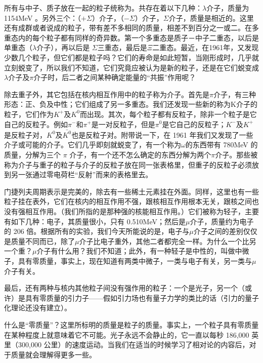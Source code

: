 所有与中子、质子放在一起的粒子统称为。共存在着以下几种：$\lambda$介子，质量为 1154MeV 。另外三个：（$ +\Sigma $）介子，（$ -\Sigma $）介子，$ \Sigma $介子，质量是相近的。这里还有成群或者说成的粒子，带有差不多相同的质量，相差不到百分之一或二。在多重态内的每个粒子都有同样的奇异数。第一个多重态是质子－中子二重态，以后是单重态（$\lambda$介子），再以后是 $ \Sigma $三重态，最后是$ \Xi $二重态。最近，在1961年，又发现少数几个粒子，但它们都是粒子吗？它们的寿命是如此短暂，当刚形成时，几乎就立刻蜕变了，所以我们不知道，它们究竟应被认为是新的粒子，还是在它们蜕变成$\lambda$介子及$\pi$介子时，后二者之间某种确定能量的“共振”作用呢？

除去重子外，其它包括在核内相互作用中的粒子称为介子。首先是$\pi$介子，有三种形态：正、负及中性；它们组成了另一多重态。我们还发现一些新的称为K介子的粒子，它们作为$ K^{+} $及$ { K }^{ 0 } $而出现。其次，每个粒子都有反粒子，除非一个粒子是它自己的反粒子。例如$\pi^{-} $和$\pi^{+} $是一对反粒子，但是$\pi^0 $是它自己的反粒子；$K^- $及$ K^+ $是反粒子对，$ { K }^{ 0 } $及$ \bar {{ K }^{ 0 } }  $也是反粒子对。附带说一下，在 1961 年我们又发现了一些介子或可能的介子。它们几乎即刻就蜕变了，有一个称为$\omega$的东西带有 780MeV 的质量，分解为三个 $\pi$ 介子，有一个还不怎么确定的东西分解为两个$\pi$介子。那些被称为介子与重子的粒子与介子的反粒子放在同一张表格里，但重子的反粒子必须放到另一张通过零电荷栏“反射”而来的表格里去。

门捷列夫周期表示是完美的，除去有一些稀土元素挂在外面。同样，这里也有一些粒子挂在表外，它们在核内的相互作用不强，跟核相互作用根本无关，跟核之间也没有强相互作用。（我们所指的是那种强的核能相互作用。）它们被称为轻子，主要有如下几种：电子，其质量很小，只有 0.510MeV；然后是$\mu$介子，质量约为电子的 206 倍。根据所有的实验，我们今天所能说的是，电子与$\mu$介子之间的差别仅仅是质量不同而已，除了$\mu$介子比电子重外，其他二者都完全一样。为什么一个比另一个重？$\mu$介子有什么用？我们不知道；此外，有一种轻子是中性的，叫做中微子，具有零质量，事实上，现在知道有两类中微子，一类与电子有关，另一类与$\mu$介子有关。

最后，还有两种与核内其他粒子间没有强作用的粒子：一个是光子，另一个（或许）是具有零质量的引力子——假如引力场也有量子力学的类比的话（引力的量子化理论还没有建立）。

什么是“零质量”？这里所标明的质量是粒子的质量。事实上，一个粒子具有零质量在某种程度上就意味着它不可能。光子永远不会静止的，它一直以每秒 186,000 英里（300,000 公里）的速度运动。当我们在适当的时候学习了相对论的内容后，对于质量就会理解得更多一些。

